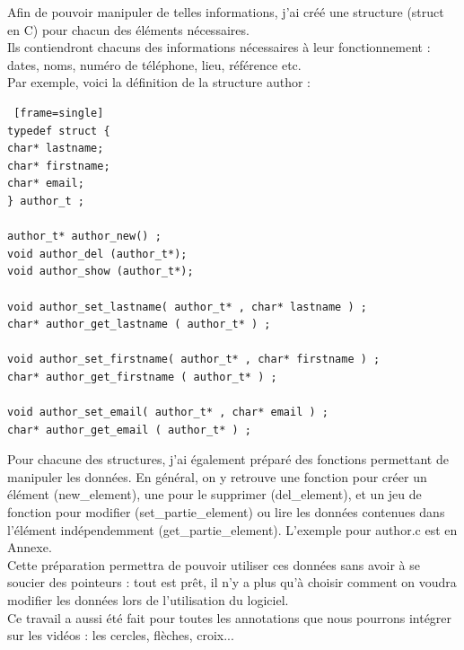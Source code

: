 \documentclass[11pt,french,a4paper]{report}
\begin{document}
Afin de pouvoir manipuler de telles informations, j'ai créé une structure (struct en C) pour chacun des éléments nécessaires. \\
Ils contiendront chacuns des informations nécessaires à leur fonctionnement : dates, noms, numéro de téléphone, lieu, référence etc. \\

Par exemple, voici la définition de la structure author : 
\begin{lstlisting} [frame=single]
typedef struct {
char* lastname;
char* firstname;
char* email;
} author_t ;

author_t* author_new() ;
void author_del (author_t*);
void author_show (author_t*);

void author_set_lastname( author_t* , char* lastname ) ;
char* author_get_lastname ( author_t* ) ;

void author_set_firstname( author_t* , char* firstname ) ;
char* author_get_firstname ( author_t* ) ;

void author_set_email( author_t* , char* email ) ;
char* author_get_email ( author_t* ) ;
\end{lstlisting}

Pour chacune des structures, j'ai également préparé des fonctions permettant de manipuler les données.
En général, on y retrouve une fonction pour créer un élément (new\_element), une pour le supprimer (del\_element),
et un jeu de fonction pour modifier (set\_partie\_element) ou lire les données contenues dans l'élément indépendemment 
(get\_partie\_element). L'exemple pour author.c est en Annexe.\\

Cette préparation permettra de pouvoir utiliser ces données sans avoir à se soucier des pointeurs : tout est prêt, il n'y
a plus qu'à choisir comment on voudra modifier les données lors de l'utilisation du logiciel. \\

Ce travail a aussi été fait pour toutes les annotations que nous pourrons intégrer sur les vidéos : 
les cercles, flèches, croix... \\
\end{document}
